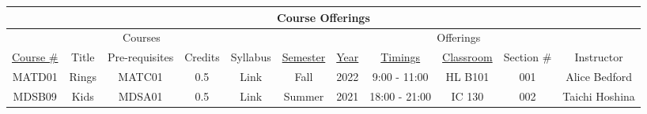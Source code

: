 \documentclass[12pt]{article}
\begin{document}
\begin{center}
    \begin{tabular}{|c|c|c|c|c||c|c|c|c|c|c|}
        \hline
        \multicolumn{11}{|c|}{\cellcolor{gray!25}Course Offerings}                                                                                        \\
        \hline
        \hline
        \multicolumn{5}{|c||}{\cellcolor{gray!25}Courses}
               & \multicolumn{6}{c|}{\cellcolor{gray!25}Offerings}                                                                                        \\
        \hline
        \cellcolor{gray!25}\underline{Course \#}
               & \cellcolor{gray!25}Title
               & \cellcolor{gray!25}Pre-requisites
               & \cellcolor{gray!25}Credits
               & \cellcolor{gray!25}Syllabus

               & \cellcolor{gray!25}\underline{Semester}
               & \cellcolor{gray!25}\underline{Year}
               & \cellcolor{gray!25}\underline{Timings}
               & \cellcolor{gray!25}\underline{Classroom}
               & \cellcolor{gray!25}Section \#
               & \cellcolor{gray!25}Instructor
        \\
        \hline \hline
        MATD01 & Rings                                             & MATC01 & 0.5 & Link & Fall   & 2022 & 9:00 - 11:00  & HL B101 & 001 & Alice Bedford  \\ \hline
        MDSB09 & Kids                                              & MDSA01 & 0.5 & Link & Summer & 2021 & 18:00 - 21:00 & IC 130  & 002 & Taichi Hoshina \\ \hline
    \end{tabular}
\end{center}
\end{document}
